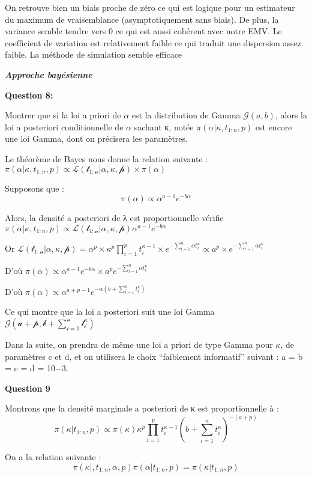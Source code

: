 \documentclass[
]{article}
\begin{document}
On retrouve bien un biais proche de zéro ce qui est logique pour un
estimateur du maximum de vraisemblance (asymptotiquement sans biais). De
plus, la variance semble tendre vers 0 ce qui est aussi cohérent avec
notre EMV. Le coefficient de variation est relativement faible ce qui
traduit une dispersion assez faible. La méthode de simulation semble
efficace

\textbf{\emph{Approche bayésienne}}

\textbf{Question 8:}

Montrer que si la loi a priori de \(\alpha\) est la distribution de
Gamma \(\mathcal G(a, b)\), alors la loi a posteriori conditionnelle de
\(\alpha\) sachant κ, notée \(\pi(α|κ, t_{1:n}, p)\) est encore une loi
Gamma, dont on précisera les paramètres.

Le théorème de Bayes nous donne la relation suivante :
\(\pi(\alpha|\kappa,t_{1:n},p) \propto \mathcal{L(t_{1:n}|\alpha,\kappa,p)}\times\pi(\alpha)\)

Supposons que : \[\pi(\alpha) \propto \alpha^{a-1}e^{-b\alpha}\]

Alors, la densité a posteriori de λ est proportionnelle vérifie
\(\pi(\alpha|\kappa,t_{1:n},p) \propto \mathcal{L(t_{1:n}|\alpha,\kappa,p)}\alpha^{a-1}e^{-b\alpha}\)

Or
\(\mathcal{L(t_{1:n}|\alpha,\kappa,p)} = \alpha^{p} \times \kappa^{p} \prod_{i = 1}^{p} t_{i}^{\kappa-1} \times e^{-\sum_{i = 1}^{n} \alpha t_{i}^{\kappa}} \propto a^{p}\times e^{-\sum_{i = 1}^{n} \alpha t_{i}^{\kappa}}\)

D'où
\(\pi(\alpha) \propto \alpha^{a-1}e^{-b\alpha} \times a^{p} e^{-\sum_{i = 1}^{n} \alpha t_{i}^{\kappa}}\)

D'où
\(\pi(\alpha) \propto \alpha^{a+p-1}e^{-\alpha(b+\sum_{i = 1}^{n} t_{i}^{\kappa})}\)

Ce qui montre que la loi a posteriori suit une loi Gamma
\(\mathcal{G(a+p,b+\sum_{i = 1}^{n} t_{i}^{\kappa})}\)

Dans la suite, on prendra de même une loi a priori de type Gamma pour
\(\kappa\), de paramètres c et d, et on utilisera le choix ``faiblement
informatif'' suivant : a = b = c = d = 10−3.

\textbf{Question 9}

Montrons que la densité marginale a posteriori de κ est proportionnelle
à :
\[\pi(\kappa|t_{1:n},p) \propto \pi(\kappa)\kappa^{p}\prod_{i=1}^{p}t_{i}^{\kappa-1}(b+\sum_{i = 1}^{n}t_{i}^{\kappa})^{-(a+p)}\]

On a la relation suivante :
\[\pi(\kappa|,t_{1:n},\alpha,p) \pi(\alpha |t_{1:n},p )  = \pi(\kappa | t_{1:n},p)\]
\end{document}

